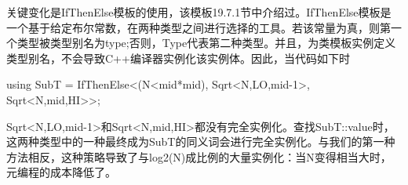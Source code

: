 关键变化是IfThenElse模板的使用，该模板19.7.1节中介绍过。IfThenElse模板是一个基于给定布尔常数，在两种类型之间进行选择的工具。若该常量为真，则第一个类型被类型别名为type;否则，Type代表第二种类型。并且，为类模板实例定义类型别名，不会导致C++编译器实例化该实例体。因此，当代码如下时

\begin{cpp}
using SubT = IfThenElse<(N<mid*mid),
						Sqrt<N,LO,mid-1>,
						Sqrt<N,mid,HI>>;
\end{cpp}

Sqrt<N,LO,mid-1>和Sqrt<N,mid,HI>都没有完全实例化。查找SubT::value时，这两种类型中的一种最终成为SubT的同义词会进行完全实例化。与我们的第一种方法相反，这种策略导致了与log2(N)成比例的大量实例化：当N变得相当大时，元编程的成本降低了。















